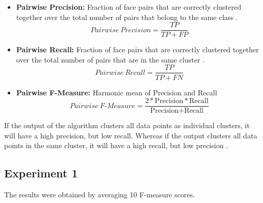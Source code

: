 \documentclass[12pt,english]{article}
\begin{document}
\begin{itemize}
\item \textbf{Pairwise Precision:} Fraction of face pairs that are correctly clustered together over the total number of pairs that belong to the same class \cite{shi}.
$$ Pairwise \ Precision = \frac{TP}{TP + FP}$$

\item \textbf{Pairwise Recall:} Fraction of face pairs that are correctly clustered together over the total number of pairs that are in the same cluster \cite{shi}.
$$ Pairwise \ Recall = \frac{TP}{TP + FN}$$

\item \textbf{Pairwise F-Measure:} Harmonic mean of Precision and Recall \cite{shi} $$Pairwise \ F\textrm{-}Measure = \frac{2 * \textrm{Precision}*\textrm{Recall}}{\textrm{Precision} + \textrm{Recall}}$$
\end{itemize}
If the output of the algorithm clusters all data points as individual clusters, it will have a high precision, but low recall. Whereas if the output clusters all data points in the same cluster, it will have a high recall, but low precision \cite{otto}.




\subsection{Experiment 1}

The results were obtained by averaging 10 F-measure scores. 
\end{document}

